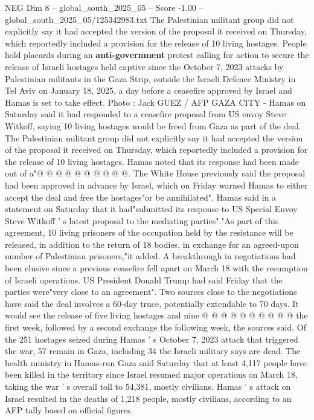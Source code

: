 \begin{textsample}{NEG Dim 8 – global\_south\_2025\_05 – Score -1.00 – global\_south\_2025\_05/125342983.txt}  \label{ex:f8_neg_310}
The Palestinian militant group did not explicitly say it had accepted the version of the proposal it received on Thursday, which reportedly included a provision for the release of 10 living hostages.
People hold placards during an \textbf{anti-government} protest calling for action to secure the release of Israeli hostages held captive since the October 7, 2023 attacks by Palestinian militants in the Gaza Strip, outside the Israeli Defence Ministry in Tel Aviv on January 18, 2025, a day before a ceasefire approved by Israel and Hamas is set to take effect.
Photo : Jack GUEZ / AFP GAZA CITY - Hamas on Saturday said it had responded to a ceasefire proposal from US envoy Steve Witkoff, saying 10 living hostages would be freed from Gaza as part of the deal.
The Palestinian militant group did not explicitly say it had accepted the version of the proposal it received on Thursday, which reportedly included a provision for the release of 10 living hostages.
Hamas noted that its response had been made out of a"@ @ @ @ @ @ @ @ @ @.
The White House previously said the proposal had been approved in advance by Israel, which on Friday warned Hamas to either accept the deal and free the hostages"or be annihilated".
Hamas said in a statement on Saturday that it had"submitted its response to US Special Envoy Steve Witkoff ' s latest proposal to the mediating parties"."As part of this agreement, 10 living prisoners of the occupation held by the resistance will be released, in addition to the return of 18 bodies, in exchange for an agreed-upon number of Palestinian prisoners,"it added.
A breakthrough in negotiations had been elusive since a previous ceasefire fell apart on March 18 with the resumption of Israeli operations.
US President Donald Trump had said Friday that the parties were"very close to an agreement".
Two sources close to the negotiations have said the deal involves a 60-day truce, potentially extendable to 70 days.
It would see the release of five living hostages and nine @ @ @ @ @ @ @ @ @ @ the first week, followed by a second exchange the following week, the sources said.
Of the 251 hostages seized during Hamas ' s October 7, 2023 attack that triggered the war, 57 remain in Gaza, including 34 the Israeli military says are dead.
The health ministry in Hamas-run Gaza said Saturday that at least 4,117 people have been killed in the territory since Israel resumed major operations on March 18, taking the war ' s overall toll to 54,381, mostly civilians.
Hamas ' s attack on Israel resulted in the deaths of 1,218 people, mostly civilians, according to an AFP tally based on official figures.

\end{textsample}
